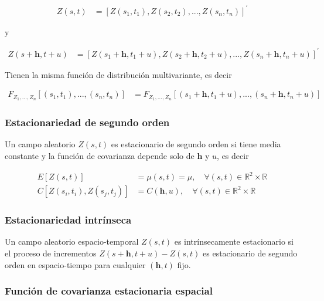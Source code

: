 \documentclass[
]{book}
\begin{document}
\begin{align}
Z(s,t)&=[Z(s_1,t_1), Z(s_2,t_2),...,Z(s_n,t_n)]^{'}
\end{align}

y

\begin{align}
Z(s+\textbf{h},t+u)&=[Z(s_1+\textbf{h},t_1+u), Z(s_2+\textbf{h},t_2+u),...,Z(s_n+\textbf{h},t_n+u)]^{'}
\end{align}

Tienen la misma función de distribución multivariante, es decir

\begin{align}
F_{Z_1,...,Z_n}[(s_1,t_1),...,(s_n,t_n)]&= F_{Z_1,...,Z_n}[(s_1+\textbf{h},t_1+ u),...,(s_n+\textbf{h},t_n+u)]
\end{align}

\hypertarget{estacionariedad-de-segundo-orden-1}{%
\subsubsection*{Estacionariedad de segundo orden}\label{estacionariedad-de-segundo-orden-1}}

Un campo aleatorio \(Z(s,t)\) es estacionario de segundo orden si tiene media constante y la función de covarianza depende solo de \(\textbf{h}\) y \(u\), es decir

\begin{align}
E[Z(s,t)]&=\mu(s,t)=\mu,\quad \forall (s,t)\in \mathbb{R}^2\times \mathbb{R} \\
C[Z(s_i,t_i),Z(s_j,t_j)]&=C(\textbf{h}, u), \quad \forall(s,t) \in \mathbb{R}^2 \times \mathbb{R}
\end{align}

\hypertarget{estacionariedad-intruxednseca-1}{%
\subsubsection*{Estacionariedad intrínseca}\label{estacionariedad-intruxednseca-1}}

Un campo aleatorio espacio-temporal \(Z(s,t)\) es intrínsecamente estacionario si el proceso de incrementos \(Z(s+\textbf{h},t+u)-Z(s,t)\) es estacionario de segundo orden en espacio-tiempo para cualquier \((\textbf{h},t)\) fijo.

\hypertarget{funciuxf3n-de-covarianza-estacionaria-espacial}{%
\subsubsection*{Función de covarianza estacionaria espacial}\label{funciuxf3n-de-covarianza-estacionaria-espacial}}
\end{document}
